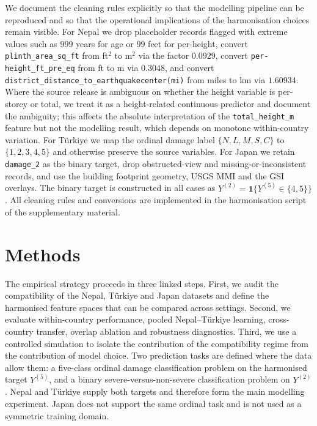 \documentclass[11pt,a4paper]{article}
\newcommand{\Y}{\ensuremath{Y}}
\begin{document}
We document the cleaning rules explicitly so that the modelling pipeline can be reproduced and so that the operational implications of the harmonisation choices remain visible. For Nepal we drop placeholder records flagged with extreme values such as $999$ years for age or $99$ feet for per-height, convert \texttt{plinth\_area\_sq\_ft} from ft$^2$ to m$^2$ via the factor $0.0929$, convert \texttt{per-height\_ft\_pre\_eq} from ft to m via $0.3048$, and convert \texttt{district\_distance\_to\_earthquakecenter(mi)} from miles to km via $1.60934$. Where the source release is ambiguous on whether the height variable is per-storey or total, we treat it as a height-related continuous predictor and document the ambiguity; this affects the absolute interpretation of the \texttt{total\_height\_m} feature but not the modelling result, which depends on monotone within-country variation. For T\"urkiye we map the ordinal damage label $\{N,L,M,S,C\}$ to $\{1,2,3,4,5\}$ and otherwise preserve the source variables. For Japan we retain \texttt{damage\_2} as the binary target, drop obstructed-view and missing-or-inconsistent records, and use the building footprint geometry, USGS MMI and the GSI overlays. The binary target is constructed in all cases as $\Y^{(2)} = \mathbf{1}\{\Y^{(5)} \in \{4,5\}\}$. All cleaning rules and conversions are implemented in the harmonisation script of the supplementary material.

\section{Methods}
\label{sec:methods}

The empirical strategy proceeds in three linked steps. First, we audit the compatibility of the Nepal, T\"urkiye and Japan datasets and define the harmonised feature spaces that can be compared across settings. Second, we evaluate within-country performance, pooled Nepal--T\"urkiye learning, cross-country transfer, overlap ablation and robustness diagnostics. Third, we use a controlled simulation to isolate the contribution of the compatibility regime from the contribution of model choice. Two prediction tasks are defined where the data allow them: a five-class ordinal damage classification problem on the harmonised target $\Y^{(5)}$, and a binary severe-versus-non-severe classification problem on $\Y^{(2)}$. Nepal and T\"urkiye supply both targets and therefore form the main modelling experiment. Japan does not support the same ordinal task and is not used as a symmetric training domain.
\end{document}
